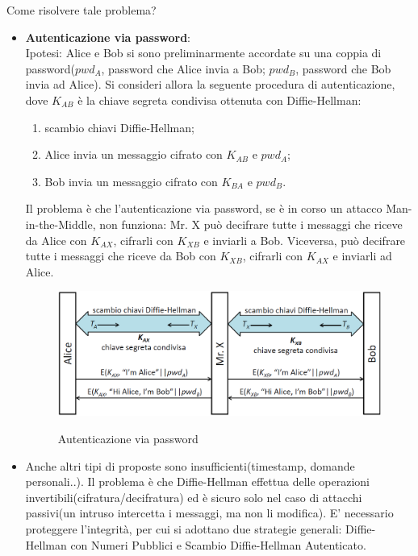 Come risolvere tale problema? 
\begin{itemize}
\item \textbf{Autenticazione via password}: \\ Ipotesi: Alice e Bob si sono preliminarmente accordate su una coppia di password($pwd_{A}$, password che Alice invia a Bob; $pwd_{B}$, password che Bob invia ad Alice). Si consideri allora la seguente procedura di autenticazione, dove $K_{AB}$ è la chiave segreta condivisa ottenuta con Diffie-Hellman: \begin{enumerate}
\item scambio chiavi Diffie-Hellman;
\item Alice invia un messaggio cifrato con $K_{AB}$ e $pwd_{A}$;
\item Bob invia un messaggio cifrato con $K_{BA}$ e $pwd_{B}$.
\end{enumerate}
Il problema è che l'autenticazione via password, se è in corso un attacco Man-in-the-Middle, non funziona: Mr. X può decifrare tutte i messaggi che riceve da Alice con $K_{AX}$, cifrarli con $K_{XB}$ e inviarli a Bob. Viceversa, può decifrare tutte i messaggi che riceve da Bob con $K_{XB}$, cifrarli con $K_{AX}$ e inviarli ad Alice.
\begin{figure}[htbp]
	\centering%
	\subfigure%
	{\includegraphics[scale=0.5, keepaspectratio]{Immagini/chiave_pubblica/DiffieHellman_passauth.png}}
	\caption{Autenticazione via password}
	\end{figure}
\item Anche altri tipi di proposte sono insufficienti(timestamp, domande personali..). Il problema è che Diffie-Hellman effettua delle operazioni invertibili(cifratura/decifratura) ed è sicuro solo nel caso di attacchi passivi(un intruso intercetta i messaggi, ma non li modifica). E' necessario proteggere l'integrità, per cui si adottano due strategie generali: Diffie-Hellman con Numeri Pubblici e Scambio Diffie-Hellman Autenticato.	
\end{itemize}

